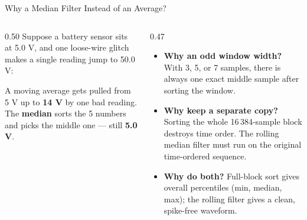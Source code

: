 \begin{frame}{Why a Median Filter Instead of an Average?}
  \begin{columns}[t, onlytextwidth]
    \begin{column}{0.50\textwidth}
      Suppose a battery sensor sits at 5.0 V, and one loose-wire glitch makes a single reading jump to 50.0 V:
      \vskip1mm
      \begin{center}
      \end{center}
      \vskip1mm
      A moving average gets pulled from 5 V up to \textbf{14 V} by one bad reading. The \textbf{median} sorts the 5 numbers and picks the middle one — still \textbf{5.0 V}.
    \end{column}
    \begin{column}{0.47\textwidth}
      \smalltext\compactitem
      \begin{itemize}
        \item \textbf{Why an odd window width?} With 3, 5, or 7 samples, there is always one exact middle sample after sorting the window.
        \item \textbf{Why keep a separate copy?} Sorting the whole 16\,384-sample block destroys time order. The rolling median filter must run on the original time-ordered sequence.
        \item \textbf{Why do both?} Full-block sort gives overall percentiles (min, median, max); the rolling filter gives a clean, spike-free waveform.
      \end{itemize}
    \end{column}
  \end{columns}
\end{frame}

